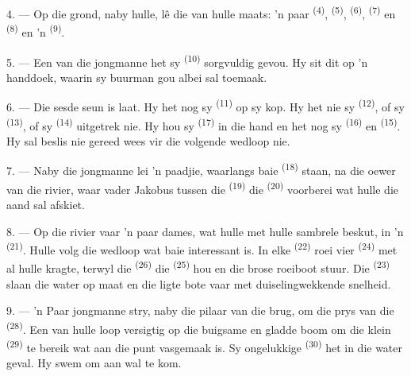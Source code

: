 4. --- Op die grond, naby hulle, lê die  van hulle maats: 'n paar
 \textsuperscript{(4)},  \textsuperscript{(5)},
 \textsuperscript{(6)},  \textsuperscript{(7)} en
 \textsuperscript{(8)} en 'n  \textsuperscript{(9)}.

5. --- Een van die jongmanne het sy  \textsuperscript{(10)} sorgvuldig
gevou. Hy sit dit op 'n handdoek, waarin sy buurman gou albei  sal
toemaak.

6. --- Die sesde seun is laat. Hy het nog sy  \textsuperscript{(11)} op sy
kop. Hy het nie sy  \textsuperscript{(12)}, of sy 
\textsuperscript{(13)}, of sy  \textsuperscript{(14)} uitgetrek nie. Hy
hou sy  \textsuperscript{(17)} in die hand en het nog sy
 \textsuperscript{(16)} en  \textsuperscript{(15)}. Hy
sal beslis nie gereed wees vir die volgende wedloop nie.

7. --- Naby die jongmanne lei 'n paadjie, waarlangs baie 
\textsuperscript{(18)} staan, na die oewer van die rivier, waar vader Jakobus tussen die
 \textsuperscript{(19)} die  \textsuperscript{(20)}
voorberei wat hulle die aand sal afskiet.

\VUsaut{4.4mm}
\VUsaut{3.4mm}

8. --- Op die rivier vaar 'n paar dames, wat hulle met hulle sambrele beskut, in 'n
 \textsuperscript{(21)}. Hulle volg die wedloop wat baie interessant is. In
elke  \textsuperscript{(22)} roei vier 
\textsuperscript{(24)} met al hulle kragte, terwyl die 
\textsuperscript{(26)} die  \textsuperscript{(25)} hou en die brose roeiboot
stuur. Die  \textsuperscript{(23)} slaan die water op maat en die ligte
bote vaar met duiselingwekkende snelheid.

9. --- 'n Paar jongmanne stry, naby die pilaar van die brug, om die prys van die
 \textsuperscript{(28)}. Een van hulle loop versigtig op die buigsame en
gladde boom om die klein  \textsuperscript{(29)} te bereik wat aan die
punt vasgemaak is. Sy ongelukkige  \textsuperscript{(30)} het in die
water geval. Hy swem om aan wal te kom.


